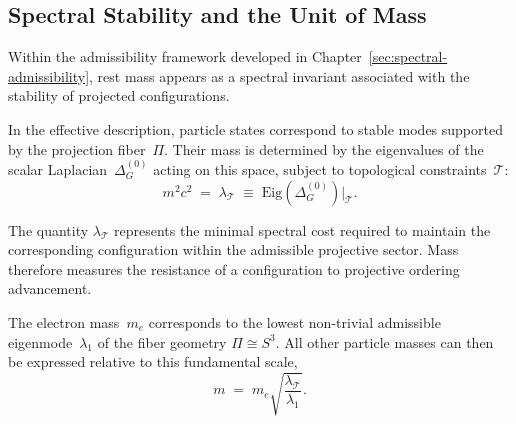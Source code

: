 \subsection{Spectral Stability and the Unit of Mass}
  \label{sec:spectral-stability}

  Within the admissibility framework developed in Chapter~\ref{sec:spectral-admissibility},
  rest mass appears as a spectral invariant associated with
  the stability of projected configurations.

  In the effective description, particle states correspond to
  stable modes supported by the projection fiber~$\Pi$.
  Their mass is determined by the eigenvalues of the scalar
  Laplacian~$\Delta^{(0)}_G$ acting on this space, subject to
  topological constraints~$\mathcal{T}$:
  \begin{equation}
    m^2 c^2 \;=\; \lambda_{\mathcal{T}}
    \;\equiv\;
    \mathrm{Eig}\!\left(\Delta^{(0)}_G\right)
    \Big|_{\mathcal{T}} .
    \label{eq:mass_spectral_def}
  \end{equation}

  The quantity $\lambda_{\mathcal{T}}$ represents the minimal
  spectral cost required to maintain the corresponding
  configuration within the admissible projective sector.
  Mass therefore measures the resistance of a configuration
  to projective ordering advancement.

  The electron mass~$m_e$ corresponds to the lowest
  non-trivial admissible eigenmode~$\lambda_1$ of the fiber
  geometry $\Pi \cong S^3$.
  All other particle masses can then be expressed relative to
  this fundamental scale,
  \begin{equation}
    m \;=\; m_e
    \sqrt{\frac{\lambda_{\mathcal{T}}}{\lambda_1}} .
  \end{equation}

